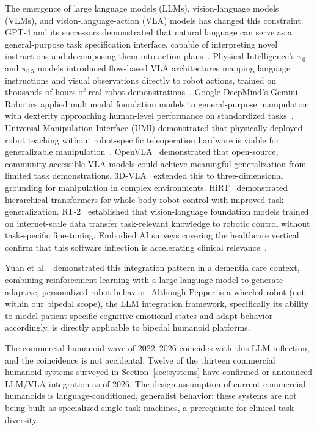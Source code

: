 The emergence of large language models (LLMs), vision-language models (VLMs), and
vision-language-action (VLA) models has changed this constraint.
GPT-4 and its successors demonstrated that natural language can serve as a
general-purpose task specification interface, capable of interpreting novel
instructions and decomposing them into action plans~\cite{openai2023gpt4}.
Physical Intelligence's $\pi_0$ and $\pi_{0.5}$ models introduced flow-based
VLA architectures mapping language instructions and visual observations directly
to robot actions, trained on thousands of hours of real robot
demonstrations~\cite{black2024pi0}. Google DeepMind's Gemini Robotics applied
multimodal foundation models to general-purpose manipulation with dexterity
approaching human-level performance on standardized
tasks~\cite{geminiroboticsTeam2025}. Universal Manipulation Interface (UMI)
demonstrated that physically deployed robot teaching without robot-specific
teleoperation hardware is viable for generalizable
manipulation~\cite{chi2024umi}. OpenVLA~\cite{kim2024openvla} demonstrated
that open-source, community-accessible VLA models could achieve meaningful
generalization from limited task demonstrations. 3D-VLA~\cite{zhen20243dvla}
extended this to three-dimensional grounding for manipulation in complex
environments. HiRT~\cite{wen2024hirt} demonstrated hierarchical transformers
for whole-body robot control with improved task generalization. RT-2~\cite{brohan2023rt2}
established that vision-language foundation models trained on internet-scale
data transfer task-relevant knowledge to robotic control without task-specific
fine-tuning. Embodied AI surveys covering the healthcare vertical confirm that
this software inflection is accelerating clinical
relevance~\cite{liu2025screens,mir2026embodied,lisondra2026embodied}.

Yuan et al.~\cite{yuan2025integrating} demonstrated this integration pattern in
a dementia care context, combining reinforcement learning with a large language
model to generate adaptive, personalized robot behavior. Although Pepper is a
wheeled robot (not within our bipedal scope), the LLM integration
framework, specifically its ability to model patient-specific
cognitive-emotional states and adapt behavior accordingly, is directly applicable
to bipedal humanoid platforms.

The commercial humanoid wave of 2022--2026 coincides with this LLM inflection,
and the coincidence is not accidental. Twelve of the thirteen commercial humanoid
systems surveyed in Section~\ref{sec:systems} have confirmed or announced
LLM/VLA integration as of 2026. The design assumption of current commercial
humanoids is language-conditioned, generalist behavior: these systems are not
being built as specialized single-task machines, a prerequisite for clinical
task diversity.

